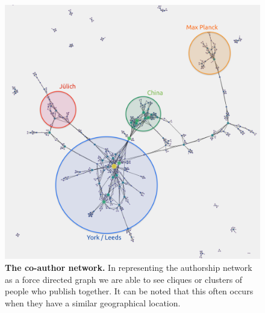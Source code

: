 \begin{figure}[H]
     \centering
         \includegraphics[width=.8\textwidth]{figures_c3/GroupAuthor.png}
        \caption{ \textbf{The co-author network.} In representing the authorship network as a force directed graph we are able to see cliques or clusters of people who publish together. It can be noted that this often occurs when they have a similar geographical location.}
        \label{fig:authorgroup}
\end{figure}


